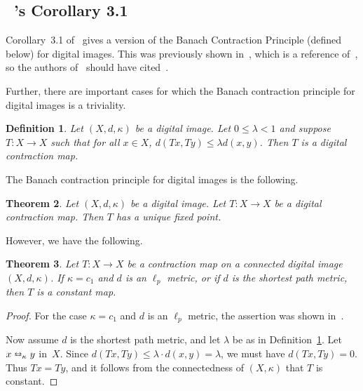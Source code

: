 \documentclass{article}
\newtheorem{thm}{Theorem}
\newtheorem{definition}[thm]{Definition}
\numberwithin{thm}{section}
\newcommand{\adjeq}{\leftrightarroweq}
\begin{document}
\subsection{~\cite{GuptaEtal}'s Corollary 3.1}
Corollary~3.1
of~\cite{GuptaEtal}
gives a version of
the Banach Contraction Principle (defined below) for digital images. This
was previously
shown in~\cite{EgeKaraca-Ban}, which is a reference 
of~\cite{GuptaEtal},
so the authors of~\cite{GuptaEtal}
should have cited~\cite{EgeKaraca-Ban}.

Further, there are
important cases
for which the Banach
contraction principle for
digital images is a
triviality.

\begin{definition}
{\rm \cite{EgeKaraca-Ban}}
\label{digContractionMap}
    Let $(X,d,\kappa)$
    be a digital
    image. Let
    $0 \le \lambda < 1$ and suppose
    $T: X \to X$
    such that for all $x \in X$,
    $d(Tx,Ty) \le \lambda d(x,y)$. Then $T$
    is a {\em digital contraction map}.
\end{definition}

The Banach
contraction principle for
digital images is
the following.
\begin{thm}
    {\rm \cite{EgeKaraca-Ban,GuptaEtal}}
    Let $(X,d,\kappa)$
    be a digital
    image. Let
    $T: X \to X$
    be a digital 
    contraction map.
    Then $T$ has a
    unique fixed point.
\end{thm}

However, we have
the following.

\begin{thm}
\label{contractionTriv}
    Let $T: X \to X$
    be a contraction
    map on a connected digital image 
    $(X,d,\kappa)$.
    If $\kappa = c_1$ and
    $d$ is an $\ell_p$ 
    metric, or if $d$ is the
    shortest path
    metric, then
    $T$ is a constant map.
\end{thm}

\begin{proof}
For the case
$\kappa = c_1$ and
$d$ is an $\ell_p$ metric,
the assertion was
shown in~\cite{BxSt19}.

Now assume $d$ is the 
shortest path metric, and
let $\lambda$ be as in
Definition~\ref{digContractionMap}. Let $x \adjeq_{\kappa} y$ in~$X$.
Since $d(Tx,Ty) \le \lambda \cdot d(x,y) = \lambda$,
we must have $d(Tx,Ty) = 0$.
Thus $Tx=Ty$, and it follows
from the connectedness of
$(X,\kappa)$ that $T$ is
constant.
\end{proof}
\end{document}
